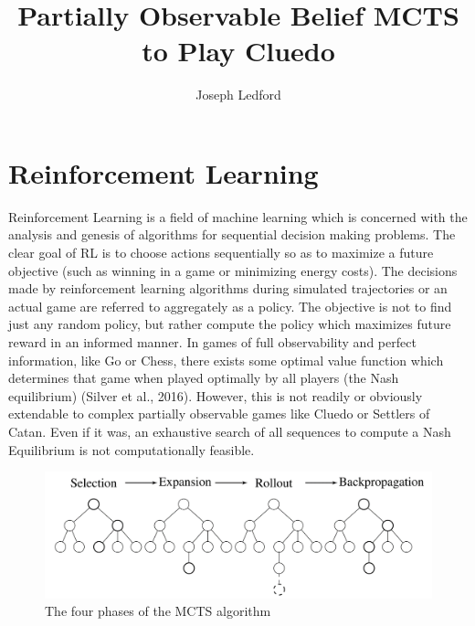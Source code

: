 \documentclass[a4paper,12pt]{proposal}
\title{Partially Observable Belief MCTS to Play Cluedo}
\author{Joseph Ledford}
\begin{document}
\maketitle 

\setlength{\parindent}{4em}
\setlength{\parskip}{1em}


\setcounter{tocdepth}{2}


\clearpage


\setlength{\parskip}{1ex} 

\section{Reinforcement Learning}
Reinforcement Learning is a field of machine learning which is concerned with the analysis and genesis of algorithms for sequential decision making problems. The clear goal of RL is to choose actions sequentially so as to maximize a future objective (such as winning in a game or minimizing energy costs). The decisions made by reinforcement learning algorithms during simulated trajectories or an actual game are referred to aggregately as a policy. The objective is not to find just any random policy, but rather compute the policy which maximizes future reward in an informed manner. In games of full observability and perfect information, like Go or Chess, there exists some optimal value function which determines that game when played optimally by all players (the Nash equilibrium) (Silver et al., 2016). However, this is not readily or obviously extendable to complex partially observable games like Cluedo or Settlers of Catan. Even if it was, an exhaustive search of all sequences to compute a Nash Equilibrium is not computationally feasible. 
\begin{figure}[h]
\caption{The four phases of the MCTS algorithm}
\centering
\includegraphics[scale=.825]{figures/MCTS}
\end{figure}
\end{document}
